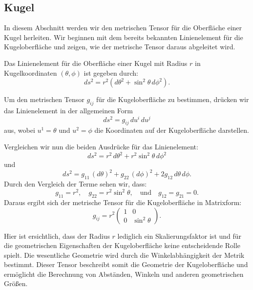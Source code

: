 %
%
%
%
\subsection{Kugel\label{geodaeten:section:MetrischerTensor:Kugel}}

In diesem Abschnitt werden wir den metrischen Tensor für die Oberfläche einer Kugel herleiten.
Wir beginnen mit dem bereits bekannten Linienelement für die Kugeloberfläche und zeigen, wie der metrische Tensor daraus abgeleitet wird.

Das Linienelement für die Oberfläche einer Kugel mit Radius $r$ in Kugelkoordinaten $(\theta, \phi)$ ist gegeben durch:
\begin{equation}
	ds^2 = r^2 \left( d\theta^2 + \sin^2\theta \, d\phi^2 \right).
\end{equation}

Um den metrischen Tensor $g_{ij}$ für die Kugeloberfläche zu bestimmen, drücken wir das Linienelement in der allgemeinen Form
\begin{equation}
	ds^2 = g_{ij} \, du^i \, du^j
\end{equation}
aus, wobei $u^1 = \theta$ und $u^2 = \phi$ die Koordinaten auf der Kugeloberfläche darstellen.

Vergleichen wir nun die beiden Ausdrücke für das Linienelement:
\begin{equation}
	ds^2 = r^2 \, d\theta^2 + r^2 \sin^2\theta \, d\phi^2
\end{equation}
und
\begin{equation}
	ds^2 = g_{11} \, (d\theta)^2 + g_{22} \, (d\phi)^2 + 2g_{12} \, d\theta \, d\phi.
\end{equation}
Durch den Vergleich der Terme sehen wir, dass:
\begin{equation}
	g_{11} = r^2, \quad g_{22} = r^2 \sin^2\theta, \quad \text{und} \quad g_{12} = g_{21} = 0.
\end{equation}
Daraus ergibt sich der metrische Tensor für die Kugeloberfläche in Matrixform:
\begin{equation}
	g_{ij} = r^2 \begin{pmatrix}
		1 & 0 \\
		0 & \sin^2\theta
	\end{pmatrix}.
\end{equation}

Hier ist ersichtlich, dass der Radius $r$ lediglich ein Skalierungsfaktor ist und für die geometrischen Eigenschaften der Kugeloberfläche keine entscheidende Rolle spielt. 
Die wesentliche Geometrie wird durch die Winkelabhängigkeit der Metrik bestimmt.
Dieser Tensor beschreibt somit die Geometrie der Kugeloberfläche und ermöglicht die Berechnung von Abständen, Winkeln und anderen geometrischen Größen.